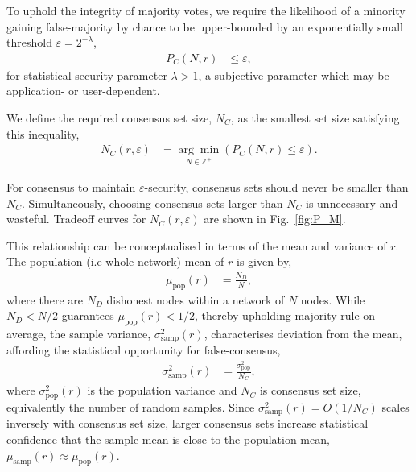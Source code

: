 To uphold the integrity of majority votes, we require the likelihood of a minority gaining false-majority by chance to be upper-bounded by an exponentially small threshold $\varepsilon = 2^{-\lambda}$,
\begin{align}
	P_C(N,r) & \leq\varepsilon,
\end{align}
for statistical security parameter $\lambda>1$, a subjective parameter which may be application- or user-dependent. %

We define the required consensus set size, $N_C$, as the smallest set size satisfying this inequality,
\begin{align}
	N_C(r,\varepsilon) & = \underset{N\in\mathbb{Z}^+}{\arg\min}(P_C(N,r)\leq\varepsilon).
\end{align}

For consensus to maintain $\varepsilon$-security, consensus sets should never be smaller than $N_C$. Simultaneously, choosing consensus sets larger than $N_C$ is unnecessary and wasteful. Tradeoff curves for $N_C(r,\varepsilon)$ are shown in Fig.~\ref{fig:P_M}.

This relationship can be conceptualised in terms of the mean and variance of $r$. The population (i.e whole-network) mean of $r$ is given by,
\begin{align}
	\mu_{\mathrm{pop}}(r) &= \frac{N_D}{N},
\end{align}
where there are $N_D$ dishonest nodes within a network of $N$ nodes. While \mbox{$N_D<N/2$} guarantees \mbox{$\mu_\mathrm{pop}(r)<1/2$}, thereby upholding majority rule on average, the sample variance, \mbox{$\sigma_{\mathrm{samp}}^2(r)$}, characterises deviation from the mean, affording the statistical opportunity for false-consensus,
\begin{align}
	\sigma_{\mathrm{samp}}^2(r) &= \frac{\sigma_{\mathrm{pop}}^2}{N_C},
\end{align}
where \mbox{$\sigma_{\mathrm{pop}}^2(r)$} is the population variance and $N_C$ is consensus set size, equivalently the number of random samples. Since \mbox{$\sigma_{\mathrm{samp}}^2(r)=O(1/N_C)$} scales inversely with consensus set size, larger consensus sets increase statistical confidence that the sample mean is close to the population mean, \mbox{$\mu_\mathrm{samp}(r)\approx \mu_\mathrm{pop}(r)$}.

